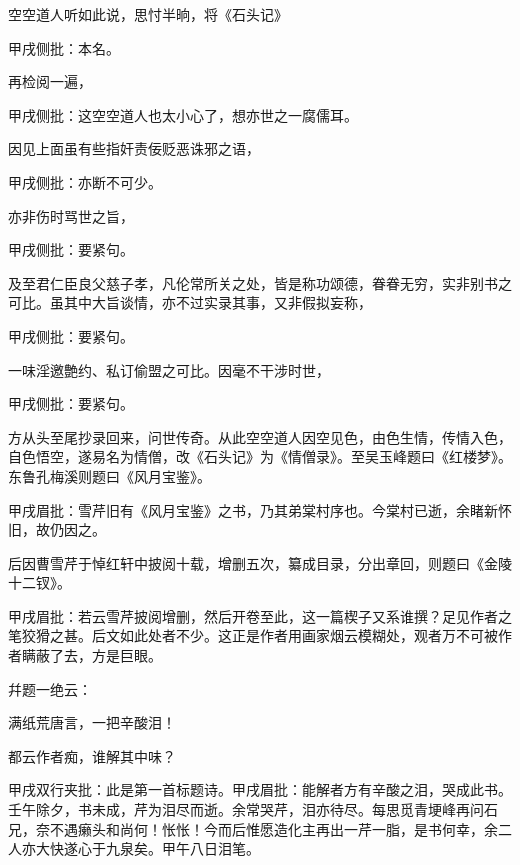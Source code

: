 \begin{parag}
    空空道人听如此说，思忖半晌，将《石头记》\begin{note}甲戌侧批：本名。\end{note}再检阅一遍，\begin{note}甲戌侧批：这空空道人也太小心了，想亦世之一腐儒耳。\end{note}因见上面虽有些指奸责佞贬恶诛邪之语，\begin{note}甲戌侧批：亦断不可少。\end{note}亦非伤时骂世之旨，\begin{note}甲戌侧批：要紧句。\end{note}及至君仁臣良父慈子孝，凡伦常所关之处，皆是称功颂德，眷眷无穷，实非别书之可比。虽其中大旨谈情，亦不过实录其事，又非假拟妄称，\begin{note}甲戌侧批：要紧句。\end{note}一味淫邀艶约、私订偷盟之可比。因毫不干涉时世，\begin{note}甲戌侧批：要紧句。\end{note}方从头至尾抄录回来，问世传奇。从此空空道人因空见色，由色生情，传情入色，自色悟空，遂易名为情僧，改《石头记》为《情僧录》。至吴玉峰题曰《红楼梦》。东鲁孔梅溪则题曰《风月宝鉴》。\begin{note}甲戌眉批：雪芹旧有《风月宝鉴》之书，乃其弟棠村序也。今棠村已逝，余睹新怀旧，故仍因之。\end{note}后因曹雪芹于悼红轩中披阅十载，增删五次，纂成目录，分出章回，则题曰《金陵十二钗》。\begin{note}甲戌眉批：若云雪芹披阅增删，然后开卷至此，这一篇楔子又系谁撰？足见作者之笔狡猾之甚。后文如此处者不少。这正是作者用画家烟云模糊处，观者万不可被作者瞒蔽了去，方是巨眼。\end{note}幷题一绝云：
\end{parag}


\begin{poem}
    \begin{pl}
        满纸荒唐言，一把辛酸泪！\end{pl}

    \begin{pl}
        都云作者痴，谁解其中味？\end{pl}
    \begin{note}甲戌双行夹批：此是第一首标题诗。甲戌眉批：能解者方有辛酸之泪，哭成此书。壬午除夕，书未成，芹为泪尽而逝。余常哭芹，泪亦待尽。每思觅青埂峰再问石兄，奈不遇癞头和尚何！怅怅！今而后惟愿造化主再出一芹一脂，是书何幸，余二人亦大快遂心于九泉矣。甲午八日泪笔。\end{note}
\end{poem}


